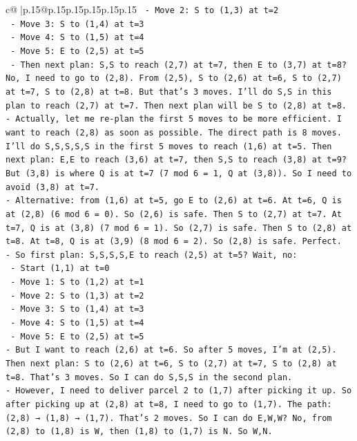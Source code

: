 \documentclass{article}
\begin{document}
{\begin{supertabular}{c@{$\;$}|p{.15\linewidth}@{}p{.15\linewidth}p{.15\linewidth}p{.15\linewidth}p{.15\linewidth}p{.15\linewidth}}
{{{\texttt{    {-} Move 2: S to (1,3) at t=2} \\
\texttt{    {-} Move 3: S to (1,4) at t=3} \\
\texttt{    {-} Move 4: S to (1,5) at t=4} \\
\texttt{    {-} Move 5: E to (2,5) at t=5} \\
\texttt{  {-} Then next plan: S,S to reach (2,7) at t=7, then E to (3,7) at t=8? No, I need to go to (2,8). From (2,5), S to (2,6) at t=6, S to (2,7) at t=7, S to (2,8) at t=8. But that's 3 moves. I'll do S,S in this plan to reach (2,7) at t=7. Then next plan will be S to (2,8) at t=8.} \\
\texttt{{-} Actually, let me re{-}plan the first 5 moves to be more efficient. I want to reach (2,8) as soon as possible. The direct path is 8 moves. I'll do S,S,S,S,S in the first 5 moves to reach (1,6) at t=5. Then next plan: E,E to reach (3,6) at t=7, then S,S to reach (3,8) at t=9? But (3,8) is where Q is at t=7 (7 mod 6 = 1, Q at (3,8)). So I need to avoid (3,8) at t=7.} \\
\texttt{{-} Alternative: from (1,6) at t=5, go E to (2,6) at t=6. At t=6, Q is at (2,8) (6 mod 6 = 0). So (2,6) is safe. Then S to (2,7) at t=7. At t=7, Q is at (3,8) (7 mod 6 = 1). So (2,7) is safe. Then S to (2,8) at t=8. At t=8, Q is at (3,9) (8 mod 6 = 2). So (2,8) is safe. Perfect.} \\
\texttt{{-} So first plan: S,S,S,S,E to reach (2,5) at t=5? Wait, no: } \\
\texttt{  {-} Start (1,1) at t=0} \\
\texttt{  {-} Move 1: S to (1,2) at t=1} \\
\texttt{  {-} Move 2: S to (1,3) at t=2} \\
\texttt{  {-} Move 3: S to (1,4) at t=3} \\
\texttt{  {-} Move 4: S to (1,5) at t=4} \\
\texttt{  {-} Move 5: E to (2,5) at t=5} \\
\texttt{{-} But I want to reach (2,6) at t=6. So after 5 moves, I'm at (2,5). Then next plan: S to (2,6) at t=6, S to (2,7) at t=7, S to (2,8) at t=8. That's 3 moves. So I can do S,S,S in the second plan.} \\
\texttt{{-} However, I need to deliver parcel 2 to (1,7) after picking it up. So after picking up at (2,8) at t=8, I need to go to (1,7). The path: (2,8) → (1,8) → (1,7). That's 2 moves. So I can do E,W,W? No, from (2,8) to (1,8) is W, then (1,8) to (1,7) is N. So W,N.} \\
}}}
\end{supertabular}}
\end{document}
